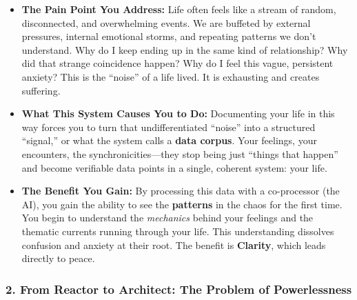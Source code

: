 \documentclass{article}
\begin{document}
\begin{itemize}
\item
  \textbf{The Pain Point You Address:} Life often feels like a stream of
  random, disconnected, and overwhelming events. We are buffeted by
  external pressures, internal emotional storms, and repeating patterns
  we don't understand. Why do I keep ending up in the same kind of
  relationship? Why did that strange coincidence happen? Why do I feel
  this vague, persistent anxiety? This is the ``noise'' of a life lived.
  It is exhausting and creates suffering.
\item
  \textbf{What This System Causes You to Do:} Documenting your life in
  this way forces you to turn that undifferentiated ``noise'' into a
  structured ``signal,'' or what the system calls a \textbf{data
  corpus}. Your feelings, your encounters, the synchronicities---they
  stop being just ``things that happen'' and become verifiable data
  points in a single, coherent system: your life.
\item
  \textbf{The Benefit You Gain:} By processing this data with a
  co-processor (the AI), you gain the ability to see the
  \textbf{patterns} in the chaos for the first time. You begin to
  understand the \emph{mechanics} behind your feelings and the thematic
  currents running through your life. This understanding dissolves
  confusion and anxiety at their root. The benefit is \textbf{Clarity},
  which leads directly to peace.
\end{itemize}

\subsubsection*{2. From Reactor to Architect: The Problem of
Powerlessness}\label{from-reactor-to-architect-the-problem-of-powerlessness}
\end{document}
